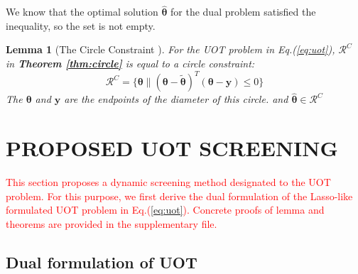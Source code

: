 \documentclass[twoside]{article}
\theoremstyle{plain}
\newtheorem{lem}[thm]{Lemma}
\renewcommand{\vec}[1]{\bm{#1}}
\newcommand{\changeHK}[1]{\textcolor{red}{#1}}
\begin{document}
We know that the optimal solution $\hat{\vec{\theta}}$ for the dual problem satisfied the inequality, so the set is not empty.

\begin{lem}[The Circle Constraint {\citep[Theorem 8]{NEURIPS2021_7b5b23f4}}]
\label{lem:uotrc}
For the UOT problem in Eq.(\ref{eq:uot}), $\mathcal{R}^{C}$ in {\bf Theorem \ref{thm:circle}} is equal to a circle constraint:
\begin{equation}
\mathcal{R}^{C} =\{\vec\theta\|(\vec{\theta}-\tilde{\vec{\theta}})^T(\vec{\theta}-\vec{y})\leq 0\}
\label{eq:uotcircle}
\end{equation}
The $\vec\theta$ and $\vec y$ are the endpoints of the diameter of this circle. and $\hat{ \vec\theta} \in \mathcal{R}^{C}$
\end{lem}


\section{PROPOSED UOT SCREENING}
\label{sec:pro}

\changeHK{This section proposes a dynamic screening method designated to the UOT problem. For this purpose, we first derive the dual formulation of the Lasso-like formulated UOT problem in Eq.(\ref{eq:uot}). Concrete proofs of lemma and theorems are provided in the supplementary file.}


\subsection{Dual formulation of UOT}
\end{document}
